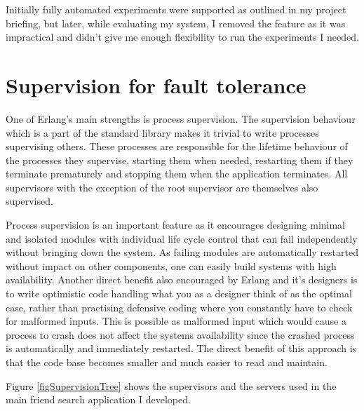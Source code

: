 Initially fully automated experiments were supported as outlined in my project briefing, but later, while evaluating my system, I removed the feature as it was impractical and didn't give me enough flexibility to run the experiments I needed.

\section{Supervision for fault tolerance}
One of Erlang's main strengths is process supervision.
The supervision behaviour which is a part of the standard library makes it trivial to write processes supervising others. These processes are responsible for the lifetime behaviour of the processes they supervise, starting them when needed, restarting them if they terminate prematurely and stopping them when the application terminates. All supervisors with the exception of the root supervisor are themselves also supervised.

Process supervision is an important feature as it encourages designing minimal and isolated modules with individual life cycle control that can fail independently without bringing down the system. As failing modules are automatically restarted without impact on other components, one can easily build systems with high availability.
Another direct benefit also encouraged by Erlang and it's designers is to write optimistic code handling what you as a designer think of as the optimal case, rather than practising defensive coding where you constantly have to check for malformed inputs. This is possible as malformed input which would cause a process to crash does not affect the systems availability since the crashed process is automatically and immediately restarted. The direct benefit of this approach is that the code base becomes smaller and much easier to read and maintain.

Figure \ref{figSupervisionTree} shows the supervisors and the servers used in the main friend search application I developed.

